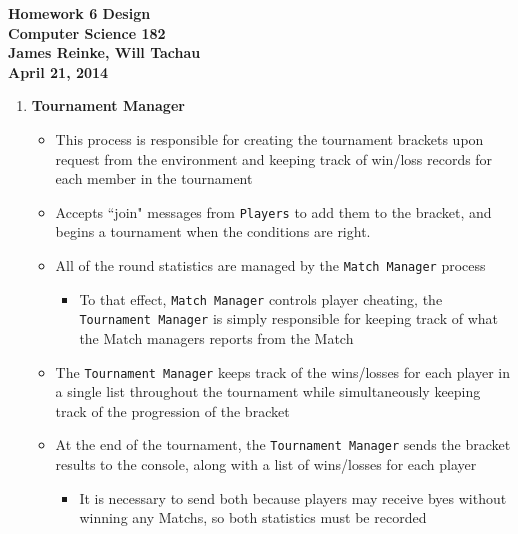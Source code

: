 \documentclass[12pt]{article}
\begin{document}
\begin{center}
	\bf
	Homework 6 Design \\
	Computer Science 182 \\
	\rm
	James Reinke, Will Tachau \\
	April 21, 2014
\end{center}

\begin{enumerate}

\item \textbf{Tournament Manager}
\begin{itemize}
	\item This process is responsible for creating the tournament brackets upon request from the environment and keeping track of win/loss records for each member in the tournament
	\item Accepts ``join" messages from \texttt{Players} to add them to the bracket, and begins a tournament when the conditions are right.
	\item All of the round statistics are managed by the \texttt{Match Manager} process
	\begin{itemize}
		\item To that effect, \texttt{Match Manager} controls player cheating, the \texttt{Tournament Manager} is simply responsible for keeping track of what the Match managers reports from the Match
	\end{itemize}
	\item The \texttt{Tournament Manager} keeps track of the wins/losses for each player in a single list throughout the tournament while simultaneously keeping track of the progression of the bracket
	\item At the end of the tournament, the \texttt{Tournament Manager} sends the bracket results to the console, along with a list of wins/losses for each player
	\begin{itemize}
		\item It is necessary to send both because players may receive byes without winning any Matchs, so both statistics must be recorded 
	\end{itemize}
\end{itemize}


\end{enumerate}
\end{document}
